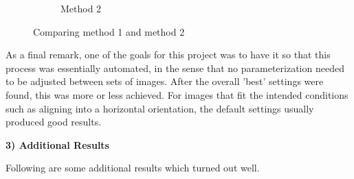 \documentclass[]{article}
\begin{document}
\begin{figure}[!h]
\begin{subfigure}[!h]{0.5\textwidth}
		\centering
		\caption{Method 2}
	\end{subfigure}%
	\centering
	\caption{Comparing method 1 and method 2}
\end{figure}

As a final remark, one of the goals for this project was to have it so that this process was essentially automated, in the sense that no parameterization needed to be adjusted between sets of images. After the overall 'best' settings were found, this was more or less achieved. For images that fit the intended conditions such as aligning into a horizontal orientation, the default settings usually produced good results.

\vspace{5mm}
\textbf{3) Additional Results}
\vspace{3mm}

Following are some additional results which turned out well.
\end{document}
